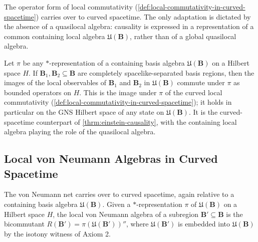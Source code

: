 The operator form of local commutativity (\ref{def:local-commutativity-in-curved-spacetime}) carries over to curved spacetime. The only adaptation is dictated by the absence of a quasilocal algebra: causality is expressed in a representation of a common containing local algebra $\mathfrak{U}(\mathbf{B})$, rather than of a global quasilocal algebra.

\begin{theorem}
    \label{thrm:einstein-causality-in-curved-spacetime}
    \leanok
    Let $\pi$ be any $*$-representation of a containing basis algebra $\mathfrak{U}(\mathbf{B})$ on a Hilbert space $H$. If $\mathbf{B}_1, \mathbf{B}_2 \subseteq \mathbf{B}$ are completely spacelike-separated basis regions, then the images of the local observables of $\mathbf{B}_1$ and $\mathbf{B}_2$ in $\mathfrak{U}(\mathbf{B})$ commute under $\pi$ as bounded operators on $H$. This is the image under $\pi$ of the curved local commutativity (\ref{def:local-commutativity-in-curved-spacetime}); it holds in particular on the GNS Hilbert space of any state on $\mathfrak{U}(\mathbf{B})$. It is the curved-spacetime counterpart of \ref{thrm:einstein-causality}, with the containing local algebra playing the role of the quasilocal algebra.
\end{theorem}

\subsection{Local von Neumann Algebras in Curved Spacetime}

The von Neumann net carries over to curved spacetime, again relative to a containing basis algebra $\mathfrak{U}(\mathbf{B})$. Given a $*$-representation $\pi$ of $\mathfrak{U}(\mathbf{B})$ on a Hilbert space $H$, the local von Neumann algebra of a subregion $\mathbf{B}' \subseteq \mathbf{B}$ is the bicommutant $R(\mathbf{B}') = \pi(\mathfrak{U}(\mathbf{B}'))''$, where $\mathfrak{U}(\mathbf{B}')$ is embedded into $\mathfrak{U}(\mathbf{B})$ by the isotony witness of Axiom 2.

